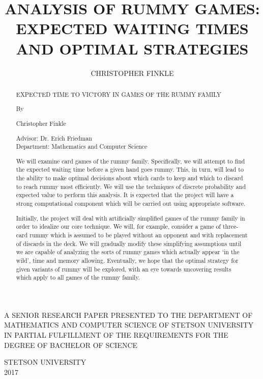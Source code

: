 \documentclass[letter,12pt]{article}
\begin{document}
\begin{titlepage}
\title{\uppercase{Analysis of Rummy Games: Expected Waiting Times and Optimal Strategies}}
\author{\uppercase{Christopher Finkle}}
\date{}
\maketitle
\vspace{8cm}
\begin{center}A SENIOR RESEARCH PAPER PRESENTED TO THE DEPARTMENT OF MATHEMATICS AND COMPUTER SCIENCE OF STETSON UNIVERSITY IN PARTIAL FULFILLMENT OF THE REQUIREMENTS FOR THE DEGREE OF BACHELOR OF SCIENCE\\
\end{center}
\begin{center}
STETSON UNIVERSITY\\
2017\end{center}
\thispagestyle{empty}
\end{titlepage}

\newpage
\begin{titlepage}
\tableofcontents
\end{titlepage}
\newpage
\listoffigures
\newpage

\begin{abstract}
\begin{center}
EXPECTED TIME TO VICTORY IN GAMES OF THE RUMMY FAMILY 
 
By 
 
Christopher Finkle 
\end{center}  
Advisor: Dr. Erich Friedman\\
Department: Mathematics and Computer Science\\
\smallskip

We will examine card games of the rummy family. Specifically, we will attempt to find the expected waiting time before a given hand goes rummy. This, in turn, will lead to the ability to make optimal decisions about which cards to keep and which to discard to reach rummy most efficiently. We will use the techniques of discrete probability and expected value to perform this analysis. It is expected that the project will have a strong computational component which will be carried out using appropriate software.  

Initially, the project will deal with artificially simplified games of the rummy family in order to idealize our core technique. We will, for example, consider a game of three-card rummy which is assumed to be played without an opponent and with replacement of discards in the deck. We will gradually modify these simplifying assumptions until we are capable of analyzing the sorts of rummy games which actually appear ‘in the wild’, time and memory allowing. Eventually, we hope that the optimal strategy for given variants of rummy will be explored, with an eye towards uncovering results which apply to all games of the rummy family. 
\end{abstract}
\end{document}
